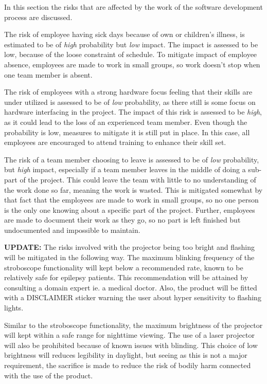 \documentclass[Main]{subfiles}
\begin{document}
	In this section the risks that are affected by the work of the software development process are discussed.

	The risk of employee having sick days because of own or children's illness, is estimated to be of \emph{high} probability but \emph{low} impact.
	The impact is assessed to be low, because of the loose constraint of schedule.
	To mitigate impact of employee absence, employees are made to work in small groups, so work doesn't stop when one team member is absent.

	The risk of employees with a strong hardware focus feeling that their skills are under utilized is assessed to be of \emph{low} probability, as there still is some focus on hardware interfacing in the project.
	The impact of this risk is assessed to be \emph{high}, as it could lead to the loss of an experienced team member.
	Even though the probability is low, measures to mitigate it is still put in place.
	In this case, all employees are encouraged to attend training to enhance their skill set.

	The risk of a team member choosing to leave is assessed to be of \emph{low} probability, but \emph{high} impact, especially if a team member leaves in the middle of doing a sub-part of the project. 
	This could leave the team with little to no understanding of the work done so far, meaning the work is wasted.
	This is mitigated somewhat by that fact that the employees are made to work in small groups, so no one person is the only one knowing about a specific part of the project.
	Further, employees are made to document their work as they go, so no part 
	is left finished but undocumented and impossible to maintain.

	\textbf{UPDATE:}
	The risks involved with the projector being too bright and flashing will be mitigated in the following way.
	The maximum blinking frequency of the stroboscope functionality will kept below a recommended rate, known to be relatively safe for epilepsy patients.
	This recommendation will be attained by consulting a domain expert ie. a medical doctor.
	Also, the product will be fitted with a DISCLAIMER sticker warning the user about hyper sensitivity to flashing lights.
	
	Similar to the stroboscope functionality, the maximum brightness of the projector will kept within a safe range for nighttime viewing.
	The use of a laser projector will also be prohibited because of known issues with blinding.
	This choice of low brightness will reduces legibility in daylight, but seeing as this is not a major requirement, the sacrifice is made to reduce the risk of bodily harm connected with the use of the product.
\end{document}
